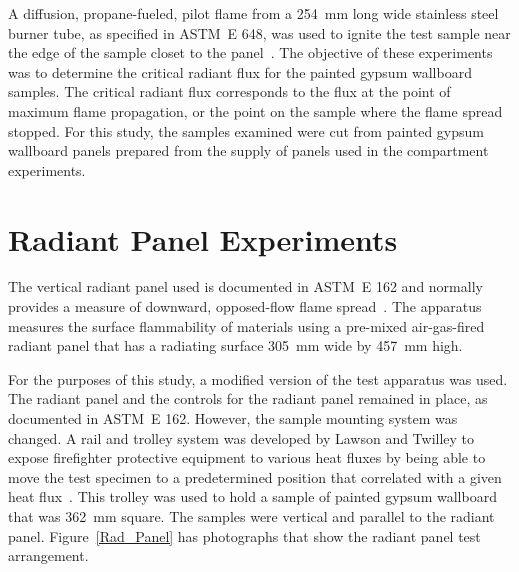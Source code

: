 \documentclass[twoside]{uocthesis}
\begin{document}
{A diffusion, propane-fueled, pilot flame from a 254~mm long wide stainless steel burner tube, as specified in ASTM~E 648, was used to ignite the test sample near the edge of the sample closet to the panel~\cite{ASTM_E648}. The objective of these experiments was to determine the critical radiant flux for the painted gypsum wallboard samples.  The critical radiant flux corresponds to the flux at the point of maximum flame propagation, or the point on the sample where the flame spread stopped. For this study, the samples examined were cut from painted gypsum wallboard panels prepared from the supply of panels used in the compartment experiments.  



\section{Radiant Panel Experiments}

The vertical radiant panel used is documented in ASTM~E 162 and normally provides a measure of downward, opposed-flow flame spread~\cite{ASTM_E162}.  The apparatus measures the surface flammability of materials using a pre-mixed air-gas-fired radiant panel that has a radiating surface 305~mm wide by 457~mm high.

For the purposes of this study, a modified version of the test apparatus was used.  The radiant panel and the controls for the radiant panel remained in place, as documented in ASTM~E 162. However, the sample mounting system was changed. A rail and trolley system was developed by Lawson and Twilley to expose firefighter protective equipment to various heat fluxes by being able to move the test specimen to a predetermined position that correlated with a given heat flux~\cite{Lawson:1999}.  This trolley was used to hold a sample of painted gypsum wallboard that was 362~mm square.  The samples were vertical and parallel to the radiant panel. Figure~\ref{Rad_Panel} has photographs that show the radiant panel test arrangement.

}
\end{document}

